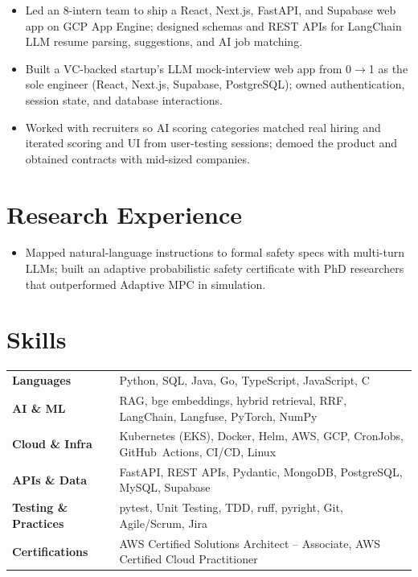 \documentclass[11pt, letterpaper]{article}
\begin{document}
\begin{itemize}
  \item Led an 8-intern team to ship a React, Next.js, FastAPI, and Supabase web app on GCP App Engine; designed schemas and REST APIs for LangChain LLM resume parsing, suggestions, and AI job matching.
\end{itemize}

\begin{itemize}
  \item Built a VC-backed startup's LLM mock-interview web app from 0$\to$1 as the sole engineer (React, Next.js, Supabase, PostgreSQL); owned authentication, session state, and database interactions.
  \item Worked with recruiters so AI scoring categories matched real hiring and iterated scoring and UI from user-testing sessions; demoed the product and obtained contracts with mid-sized companies.
\end{itemize}

\section{Research Experience}
\begin{itemize}
  \item Mapped natural-language instructions to formal safety specs with multi-turn LLMs; built an adaptive probabilistic safety certificate with PhD researchers that outperformed Adaptive MPC in simulation.
\end{itemize}

\section{Skills}
\begin{tabularx}{\textwidth}{@{}l @{\hspace{7pt}} >{\raggedright\arraybackslash}X@{}}
  \textbf{Languages} & Python, SQL, Java, Go, TypeScript, JavaScript, C \\[1pt]
  \textbf{AI \& ML} & RAG, bge embeddings, hybrid retrieval, RRF, LangChain, Langfuse, PyTorch, NumPy \\[1pt]
  \textbf{Cloud \& Infra} & Kubernetes (EKS), Docker, Helm, AWS, GCP, CronJobs, GitHub~Actions, CI/CD, Linux \\[1pt]
  \textbf{APIs \& Data} & FastAPI, REST APIs, Pydantic, MongoDB, PostgreSQL, MySQL, Supabase \\[1pt]
  \textbf{Testing \& Practices} & pytest, Unit Testing, TDD, ruff, pyright, Git, Agile/Scrum, Jira \\[1pt]
  \textbf{Certifications} & AWS Certified Solutions Architect -- Associate, AWS Certified Cloud Practitioner \\
\end{tabularx}
\end{document}
